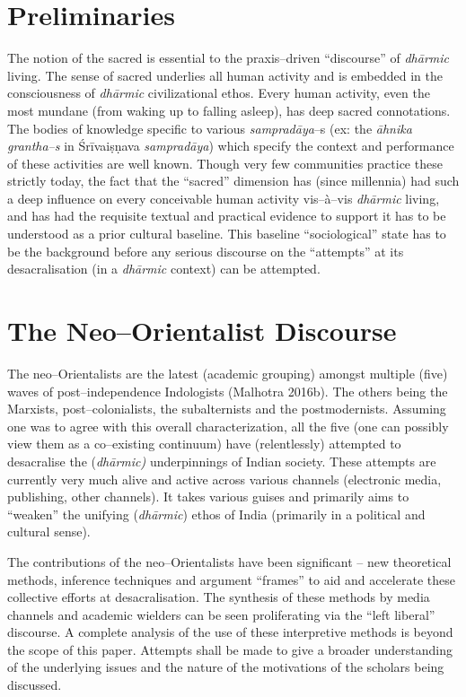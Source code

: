 \section*{Preliminaries}

The notion of the sacred is essential to the praxis–driven “discourse” of \textit{dhārmic} living. The sense of sacred underlies all human activity and is embedded in the consciousness of \textit{dhārmic} civilizational ethos. Every human activity, even the most mundane (from waking up to falling asleep), has deep sacred connotations. The bodies of knowledge specific to various \textit{sampradāya}–s (ex: the \textit{āhnika grantha–s }in Śrīvaiṣṇava \textit{sampradāya}) which specify the context and performance of these activities are well known. Though very few communities practice these strictly today, the fact that the “sacred” dimension has (since millennia) had such a deep influence on every conceivable human activity vis–à–vis \textit{dhārmic} living, and has had the requisite textual and practical evidence to support it has to be understood as a prior cultural baseline. This baseline “sociological” state has to be the background before any serious discourse on the “attempts” at its desacralisation (in a \textit{dhārmic} context) can be attempted.


\section*{The Neo–Orientalist Discourse}

The neo–Orientalists are the latest (academic grouping) amongst multiple (five) waves of post–independence Indologists (Malhotra 2016b). The others being the Marxists, post–colonialists, the subalternists and the postmodernists. Assuming one was to agree with this overall characterization, all the five (one can possibly view them as a co–existing continuum) have (relentlessly) attempted to desacralise the (\textit{dhārmic)} underpinnings of Indian society. These attempts are currently very much alive and active across various channels (electronic media, publishing, other channels). It takes various guises and primarily aims to “weaken” the unifying (\textit{dhārmic}) ethos of India (primarily in a political and cultural sense).

The contributions of the neo–Orientalists have been significant – new theoretical methods, inference techniques and argument “frames” to aid and accelerate these collective efforts at desacralisation. The synthesis of these methods by media channels and academic wielders can be seen proliferating via the “left liberal” discourse. A complete analysis of the use of these interpretive methods is beyond the scope of this paper. Attempts shall be made to give a broader understanding of the underlying issues and the nature of the motivations of the scholars being discussed.

